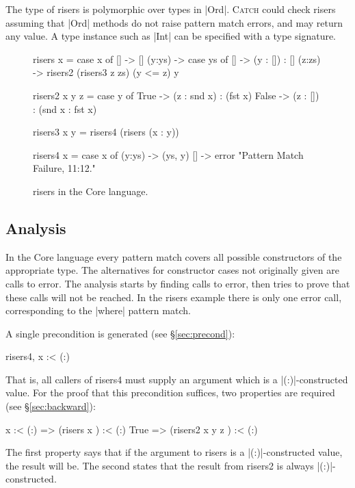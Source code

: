 \documentclass[preprint]{sigplanconf}
\newcommand{\C}[1]{\textsf{#1}}
\newcommand{\catch}{\textsc{Catch}}
\begin{document}
The type of \C{risers} is polymorphic over types in |Ord|. \catch{} could check \C{risers} assuming that |Ord| methods do not raise pattern match errors, and may return any value. A type instance such as |Int| can be specified with a type signature.

\begin{figure}
\begin{code}
risers x = case x of
    [] -> []
    (y:ys) ->  case ys of
         [] -> (y : []) : []
         (z:zs) -> risers2 (risers3 z zs) (y <= z) y

risers2 x y z =  case y of
    True -> (z : snd x) : (fst x)
    False -> (z : []) : (snd x : fst x)

risers3 x y = risers4 (risers (x : y))

risers4 x = case x of
    (y:ys) -> (ys, y)
    [] -> error "Pattern Match Failure, 11:12."
\end{code}
\caption{\C{risers} in the Core language.}
\label{fig:risers_core}
\end{figure}

\subsection{Analysis}

In the Core language every pattern match covers all possible constructors of the appropriate type. The alternatives for constructor cases not originally given are calls to \C{error}. The analysis starts by finding calls to \C{error}, then tries to prove that these calls will not be reached. In the \C{risers} example there is only one \C{error} call, corresponding to the |where| pattern match.

A single precondition is generated (see \S\ref{sec:precond}):

\begin{code}
risers4, x :< (:)
\end{code}

That is, all callers of \C{risers4} must supply an argument which is a |(:)|-constructed value. For the proof that this precondition suffices, two properties are required (see \S\ref{sec:backward}):

\begin{code}
x :< (:)  => (risers x       ) :< (:)
True      => (risers2 x y z  ) :< (:)
\end{code}

\noindent The first property says that if the argument to \C{risers} is a |(:)|-constructed value, the result will be. The second states that the result from \C{risers2} is always |(:)|-constructed.
\end{document}
